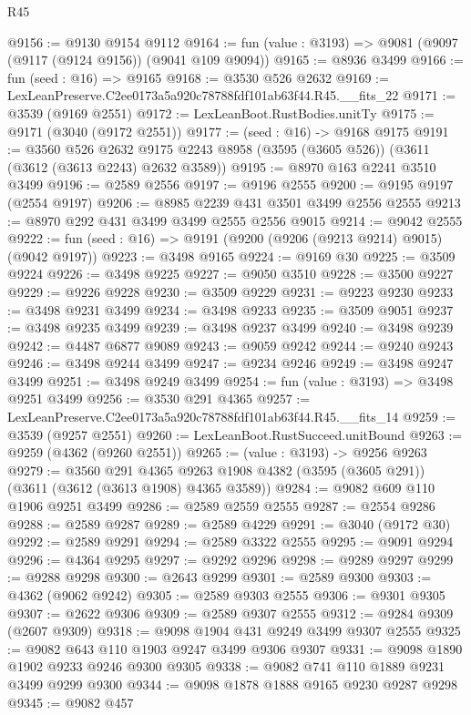 \begin{lexlean}{R45}
\begin{coremodule}
@9156 := @9130 @9154 @9112
@9164 := fun (value : @3193) => @9081 (@9097 (@9117 (@9124 @9156)) (@9041 @109 @9094))
@9165 := @8936 @3499
@9166 := fun (seed : @16) => @9165
@9168 := @3530 @526 @2632
@9169 := LexLeanPreserve.C2ee0173a5a920c78788fdf101ab63f44.R45.__fits_22
@9171 := @3539 (@9169 @2551)
@9172 := LexLeanBoot.RustBodies.unitTy
@9175 := @9171 (@3040 (@9172 @2551))
@9177 := (seed : @16) -> @9168 @9175
@9191 := @3560
    @526
    @2632
    @9175
    @2243
    @8958
    (@3595 (@3605 @526))
    (@3611 (@3612 (@3613 @2243) @2632 @3589))
@9195 := @8970 @163 @2241 @3510 @3499
@9196 := @2589 @2556
@9197 := @9196 @2555
@9200 := @9195 @9197 (@2554 @9197)
@9206 := @8985 @2239 @431 @3501 @3499 @2556 @2555
@9213 := @8970 @292 @431 @3499 @3499 @2555 @2556 @9015
@9214 := @9042 @2555
@9222 := fun (seed : @16) => @9191 (@9200 (@9206 (@9213 @9214) @9015) (@9042 @9197))
@9223 := @3498 @9165
@9224 := @9169 @30
@9225 := @3509 @9224
@9226 := @3498 @9225
@9227 := @9050 @3510
@9228 := @3500 @9227
@9229 := @9226 @9228
@9230 := @3509 @9229
@9231 := @9223 @9230
@9233 := @3498 @9231 @3499
@9234 := @3498 @9233
@9235 := @3509 @9051
@9237 := @3498 @9235 @3499
@9239 := @3498 @9237 @3499
@9240 := @3498 @9239
@9242 := @4487 @6877 @9089
@9243 := @9059 @9242
@9244 := @9240 @9243
@9246 := @3498 @9244 @3499
@9247 := @9234 @9246
@9249 := @3498 @9247 @3499
@9251 := @3498 @9249 @3499
@9254 := fun (value : @3193) => @3498 @9251 @3499
@9256 := @3530 @291 @4365
@9257 := LexLeanPreserve.C2ee0173a5a920c78788fdf101ab63f44.R45.__fits_14
@9259 := @3539 (@9257 @2551)
@9260 := LexLeanBoot.RustSucceed.unitBound
@9263 := @9259 (@4362 (@9260 @2551))
@9265 := (value : @3193) -> @9256 @9263
@9279 := @3560
    @291
    @4365
    @9263
    @1908
    @4382
    (@3595 (@3605 @291))
    (@3611 (@3612 (@3613 @1908) @4365 @3589))
@9284 := @9082 @609 @110 @1906 @9251 @3499
@9286 := @2589 @2559 @2555
@9287 := @2554 @9286
@9288 := @2589 @9287
@9289 := @2589 @4229
@9291 := @3040 (@9172 @30)
@9292 := @2589 @9291
@9294 := @2589 @3322 @2555
@9295 := @9091 @9294
@9296 := @4364 @9295
@9297 := @9292 @9296
@9298 := @9289 @9297
@9299 := @9288 @9298
@9300 := @2643 @9299
@9301 := @2589 @9300
@9303 := @4362 (@9062 @9242)
@9305 := @2589 @9303 @2555
@9306 := @9301 @9305
@9307 := @2622 @9306
@9309 := @2589 @9307 @2555
@9312 := @9284 @9309 (@2607 @9309)
@9318 := @9098 @1904 @431 @9249 @3499 @9307 @2555
@9325 := @9082 @643 @110 @1903 @9247 @3499 @9306 @9307
@9331 := @9098 @1890 @1902 @9233 @9246 @9300 @9305
@9338 := @9082 @741 @110 @1889 @9231 @3499 @9299 @9300
@9344 := @9098 @1878 @1888 @9165 @9230 @9287 @9298
@9345 := @9082 @457

\end{coremodule}
\end{lexlean}
